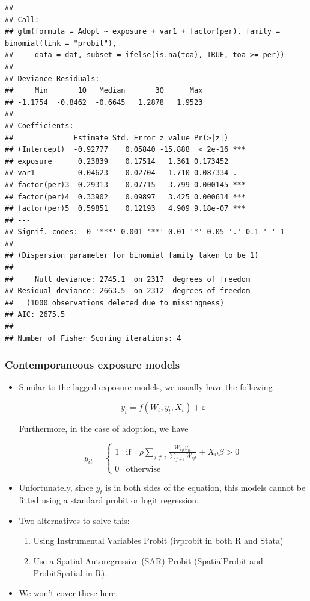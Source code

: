 \documentclass[]{book}
\begin{document}
\begin{itemize}
\begin{verbatim}
## 
## Call:
## glm(formula = Adopt ~ exposure + var1 + factor(per), family = binomial(link = "probit"), 
##     data = dat, subset = ifelse(is.na(toa), TRUE, toa >= per))
## 
## Deviance Residuals: 
##     Min       1Q   Median       3Q      Max  
## -1.1754  -0.8462  -0.6645   1.2878   1.9523  
## 
## Coefficients:
##              Estimate Std. Error z value Pr(>|z|)    
## (Intercept)  -0.92777    0.05840 -15.888  < 2e-16 ***
## exposure      0.23839    0.17514   1.361 0.173452    
## var1         -0.04623    0.02704  -1.710 0.087334 .  
## factor(per)3  0.29313    0.07715   3.799 0.000145 ***
## factor(per)4  0.33902    0.09897   3.425 0.000614 ***
## factor(per)5  0.59851    0.12193   4.909 9.18e-07 ***
## ---
## Signif. codes:  0 '***' 0.001 '**' 0.01 '*' 0.05 '.' 0.1 ' ' 1
## 
## (Dispersion parameter for binomial family taken to be 1)
## 
##     Null deviance: 2745.1  on 2317  degrees of freedom
## Residual deviance: 2663.5  on 2312  degrees of freedom
##   (1000 observations deleted due to missingness)
## AIC: 2675.5
## 
## Number of Fisher Scoring iterations: 4
\end{verbatim}
\end{itemize}

\hypertarget{contemporaneous-exposure-models}{%
\subsubsection{Contemporaneous exposure models}\label{contemporaneous-exposure-models}}

\begin{itemize}
\item
  Similar to the lagged exposure models, we usually have the following

  \[
  y_t = f(W_t, y_t, X_t) + \varepsilon
  \]

  Furthermore, in the case of adoption, we have

  \[
  y_{it} = \left\{
  \begin{array}{ll}
  1 & \mbox{if}\quad \rho\sum_{j\neq i}\frac{W_{ijt}y_{it}}{\sum_{j\neq i}W_{ijt}} + X_{it}\beta > 0\\
  0 & \mbox{otherwise}
  \end{array}
  \right.
  \]
\item
  Unfortunately, since \(y_t\) is in both sides of the equation, this models cannot
  be fitted using a standard probit or logit regression.
\item
  Two alternatives to solve this:

  \begin{enumerate}
  \def\labelenumi{\alph{enumi}.}
  \item
    Using Instrumental Variables Probit (ivprobit in both R and Stata)
  \item
    Use a Spatial Autoregressive (SAR) Probit (SpatialProbit and ProbitSpatial in R).
  \end{enumerate}
\item
  We won't cover these here.
\end{itemize}
\end{document}
